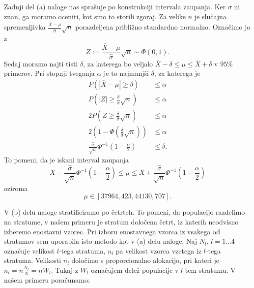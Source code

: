 \documentclass{article}
\begin{document}
Zadnji del (a) naloge nas sprašuje po konstrukciji intervala zaupanja. Ker $\sigma$
ni znan, ga moramo oceniti, kot smo to storili zgoraj. Za velike $n$ je slučajna
spremenljivka $\frac{\overline{X} - \mu}{\hat{\sigma}} \sqrt{n}$ porazdeljena približno standardno normalno.
Označimo jo z
$$ Z := \frac{\overline{X} - \mu}{\hat{\sigma}} \sqrt{n} \sim \Phi\left( 0, 1\right) \text{.}$$
Sedaj moramo najti tisti $\delta$, za katerega bo veljalo 
$\overline{X} - \delta \leq \mu \leq \overline{X} + \delta$ v $95\%$ primerov.
Pri stopnji tveganja $\alpha$ je to najmanjši $\delta$, za katerega je 
\begin{align*}
    P \left( | \overline{X} - \mu | \geq \delta \right) &\leq \alpha \\
    P \left( |Z| \geq \frac{\delta}{\hat{\sigma}} \sqrt{n} \right) &\leq \alpha \\
    2 P \left( Z \geq \frac{\delta}{\hat{\sigma}} \sqrt{n}  \right) &\leq \alpha \\
    2 \left( 1 - \Phi \left( \frac{\delta}{\hat{\sigma}} \sqrt{n}  \right)\right) &\leq \alpha \\
    \frac{\hat{\sigma}}{\sqrt{n}} \Phi^{-1} \left( 1 - \frac{\alpha}{2} \right) &\leq \delta \text{.}
\end{align*}
To pomeni, da je iskani interval zaupanja 
$$ \overline{X} - \frac{\hat{\sigma}}{\sqrt{n}} \Phi^{-1} \left( 1 - \frac{\alpha}{2} \right) \leq 
\mu \leq \overline{X} + \frac{\hat{\sigma}}{\sqrt{n}} \Phi^{-1} \left( 1 - \frac{\alpha}{2} \right)$$
oziroma
$$ \mu \in \left[ 37964{,}423, 44130{,}707 \right] \text{.}$$

V (b) delu naloge stratificiramo po četrteh. To pomeni, da populacijo 
razdelimo na stratume, v našem primeru je stratum določena četrt, iz katerih neodvisno izberemo 
enostavni vzorec. Pri izboru enostavnega vzorca iz vsakega od stratumov sem uporabila isto metodo 
kot v (a) delu naloge. Naj $N_l$, $l = 1 \dots 4$ označuje velikost $l$-tega stratuma, $n_l$ pa velikost 
vzorca vzetega iz $l$-tega stratuma. Velikosti $n_l$ določimo s proporcionalno alokacijo,
pri kateri je $n_l = n \frac{N_l}{N} = n W_l$. Tukaj z $W_l$ označujem delež populacije v 
$l$-tem stratumu. V našem primeru poračunamo:
\end{document}
